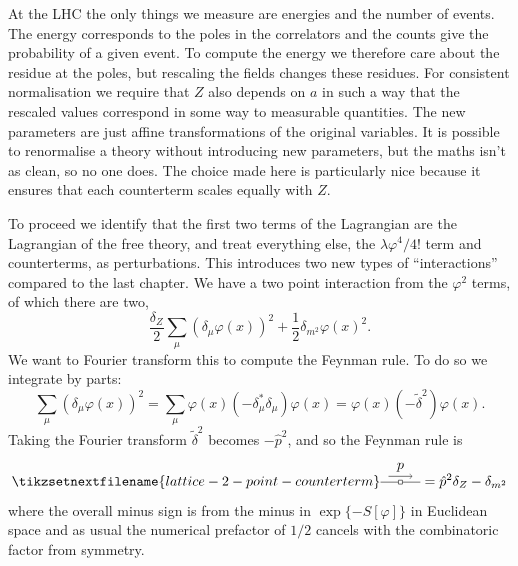 \documentclass[fleqn]{NotesClass}
\newcommand{\forwardDerivative}{\delta}
\newcommand{\backwardDerivative}{\delta^*}
\newcommand{\mixedLaplacian}{{\widetilde{\delta}^2}}
\begin{document}
    At the LHC the only things we measure are energies and the number of events.
    The energy corresponds to the poles in the correlators and the counts give the probability of a given event.
    To compute the energy we therefore care about the residue at the poles, but rescaling the fields changes these residues.
    For consistent normalisation we require that \(Z\) also depends on \(a\) in such a way that the rescaled values correspond in some way to measurable quantities.
    The new parameters are just affine transformations of the original variables.
    It is possible to renormalise a theory without introducing new parameters, but the maths isn't as clean, so no one does.
    The choice made here is particularly nice because it ensures that each counterterm scales equally with \(Z\).
    
    To proceed we identify that the first two terms of the Lagrangian are the Lagrangian of the free theory, and treat everything else, the \(\lambda\varphi^4/4!\) term and counterterms, as perturbations.
    This introduces two new types of \enquote{interactions} compared to the last chapter.
    We have a two point interaction from the \(\varphi^2\) terms, of which there are two, 
    \begin{equation}
        \frac{\delta_Z}{2}\sum_\mu (\forwardDerivative_\mu \varphi(x))^2 + \frac{1}{2}\delta_{m^2}\varphi(x)^2.
    \end{equation}
    We want to Fourier transform this to compute the Feynman rule.
    To do so we integrate by parts:
    \begin{equation}
        \sum_\mu (\forwardDerivative_\mu \varphi(x))^2 = \sum_\mu \varphi(x)(-\backwardDerivative_\mu \forwardDerivative_\mu) \varphi(x) = \varphi(x) (-\mixedLaplacian)\varphi(x).
    \end{equation}
    Taking the Fourier transform \(\mixedLaplacian\) becomes \(-\hat{p}^2\), and so the Feynman rule is
    \begin{equation}
        \tikzsetnextfilename{lattice-2-point-counterterm}
        \begin{tikzpicture}[baseline=-2.5pt]
            \draw (0, 0) -- (1, 0);
            \draw[fill=white] (0.45, -0.05) rectangle (0.55, 0.05);
            \draw[->] (0.2, 0.15) -- (0.8, 0.15) node [midway, above] {\(p\)};
        \end{tikzpicture}
        = \hat{p}^2\delta_Z - \delta_{m^2}
    \end{equation}
    where the overall minus sign is from the minus in \(\exp\{-S[\varphi]\}\) in Euclidean space and as usual the numerical prefactor of \(1/2\) cancels with the combinatoric factor from symmetry.
\end{document}
